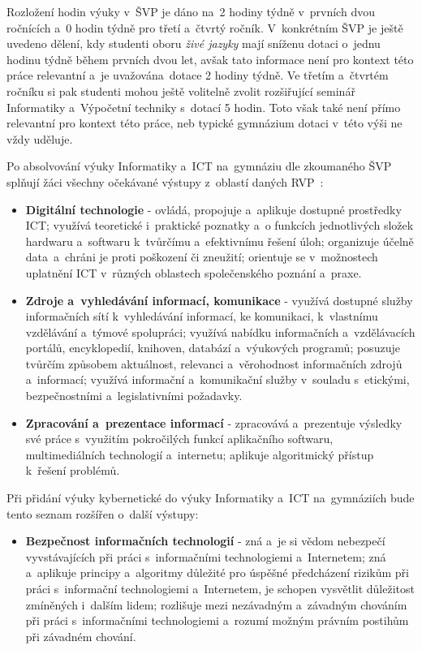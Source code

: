 \documentclass[a4paper, 12pt]{article}
\begin{document}
Rozložení hodin výuky v~ŠVP je dáno na~2 hodiny týdně v~prvních dvou ročnících a~0 hodin týdně pro třetí a~čtvrtý ročník. V~konkrétním ŠVP je ještě uvedeno dělení, kdy studenti oboru \textit{živé jazyky} mají sníženu dotaci o~jednu hodinu týdně během prvních dvou let, avšak tato informace není pro kontext této práce relevantní a~je uvažována~dotace 2 hodiny týdně. Ve třetím a~čtvrtém ročníku si pak studenti mohou ještě volitelně zvolit rozšiřující seminář Informatiky a~Výpočetní techniky s~dotací 5 hodin. Toto však také není přímo relevantní pro kontext této práce, neb typické gymnázium dotaci v~této výši ne vždy uděluje.

Po absolvování výuky Informatiky a~ICT na~gymnáziu dle zkoumaného ŠVP splňují žáci všechny očekávané výstupy z~oblastí daných RVP~\cite{rvpGym}:
\begin{itemize}
    \setlength{\itemsep}{-3pt}
    \item \textbf{Digitální technologie} - ovládá, propojuje a~aplikuje dostupné prostředky ICT; využívá teoretické i~praktické poznatky a~o funkcích jednotlivých složek hardwaru a~softwaru k~tvůrčímu a~efektivnímu řešení úloh; organizuje účelně data~a~chráni je proti poškození či zneužití; orientuje se v~možnostech uplatnění ICT v~různých oblastech společenského poznání a~praxe.
    \item \textbf{Zdroje a~vyhledávání informací, komunikace} - využívá dostupné služby informačních sítí k~vyhledávání informací, ke komunikaci, k~vlastnímu vzdělávání a~týmové spolupráci; využívá nabídku informačních a~vzdělávacích portálů, encyklopedií, knihoven, databází a~výukových programů; posuzuje tvůrčím způsobem aktuálnost, relevanci a~věrohodnost informačních zdrojů a~informací; využívá informační a~komunikační služby v~souladu s~etickými, bezpečnostními a~legislativními požadavky.
    \item \textbf{Zpracování a~prezentace informací} - zpracovává a~prezentuje výsledky své práce s~využitím pokročilých funkcí aplikačního softwaru, multimediálních technologií a~internetu; aplikuje algoritmický přístup k~řešení problémů.
\end{itemize}

Při přidání výuky kybernetické do výuky Informatiky a~ICT na~gymnáziích bude tento seznam rozšířen o~další výstupy:
\begin{itemize}
    \setlength{\itemsep}{-3pt}
    \item \textbf{Bezpečnost informačních technologií} - zná a~je si vědom nebezpečí vyvstávajících při práci s~informačními technologiemi a~Internetem; zná a~aplikuje principy a~algoritmy důležité pro úspěšné předcházení rizikům při práci s~informační technologiemi a~Internetem, je schopen vysvětlit důležitost zmíněných i~dalším lidem; rozlišuje mezi nezávadným a~závadným chováním při práci s~informačními technologiemi a~rozumí možným právním postihům při závadném chování.
\end{itemize}
\end{document}
